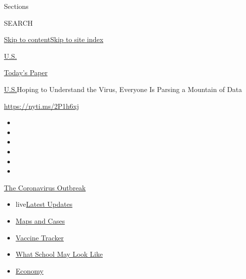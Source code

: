 Sections

SEARCH

\protect\hyperlink{site-content}{Skip to
content}\protect\hyperlink{site-index}{Skip to site index}

\href{https://www.nytimes.com/section/us}{U.S.}

\href{https://myaccount.nytimes.com/auth/login?response_type=cookie\&client_id=vi}{}

\href{https://www.nytimes.com/section/todayspaper}{Today's Paper}

\href{/section/us}{U.S.}\textbar{}Hoping to Understand the Virus,
Everyone Is Parsing a Mountain of Data

\url{https://nyti.ms/2P1h6xj}

\begin{itemize}
\item
\item
\item
\item
\item
\item
\end{itemize}

\href{https://www.nytimes.com/news-event/coronavirus?action=click\&pgtype=Article\&state=default\&region=TOP_BANNER\&context=storylines_menu}{The
Coronavirus Outbreak}

\begin{itemize}
\tightlist
\item
  live\href{https://www.nytimes.com/2020/08/01/world/coronavirus-covid-19.html?action=click\&pgtype=Article\&state=default\&region=TOP_BANNER\&context=storylines_menu}{Latest
  Updates}
\item
  \href{https://www.nytimes.com/interactive/2020/us/coronavirus-us-cases.html?action=click\&pgtype=Article\&state=default\&region=TOP_BANNER\&context=storylines_menu}{Maps
  and Cases}
\item
  \href{https://www.nytimes.com/interactive/2020/science/coronavirus-vaccine-tracker.html?action=click\&pgtype=Article\&state=default\&region=TOP_BANNER\&context=storylines_menu}{Vaccine
  Tracker}
\item
  \href{https://www.nytimes.com/interactive/2020/07/29/us/schools-reopening-coronavirus.html?action=click\&pgtype=Article\&state=default\&region=TOP_BANNER\&context=storylines_menu}{What
  School May Look Like}
\item
  \href{https://www.nytimes.com/live/2020/07/31/business/stock-market-today-coronavirus?action=click\&pgtype=Article\&state=default\&region=TOP_BANNER\&context=storylines_menu}{Economy}
\end{itemize}

